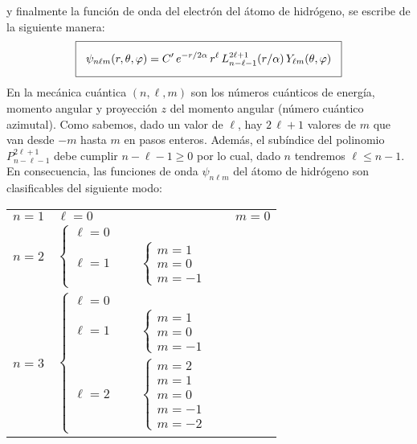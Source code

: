 y finalmente la función de onda del electrón del átomo de hidrógeno, se escribe de la siguiente manera:
\[ \setlength{\fboxsep}{3\fboxsep}\boxed{\psi_{n \ell m} (r, \theta, \varphi) = C^{\prime} \, e^{-r/2 \alpha} \, r^{\ell} \, L_{n -\ell-1}^{2 \ell+1} (r / \alpha) \, Y_{\ell m} (\theta, \varphi)} \]
En la mecánica cuántica $(n, \ell, m)$ son los números cuánticos de energía, momento angular y proyección $z$ del momento angular (número cuántico azimutal). Como sabemos, dado un valor de $\ell$, hay $2 \, \ell + 1$ valores de $m$ que van desde $-m$ hasta $m$ en pasos enteros. Además, el subíndice del polinomio $P_{n-\ell-1}^{2 \ell+1}$ debe cumplir $n - \ell - 1 \geq 0$ por lo cual, dado $n$ tendremos $\ell \leq n - 1$. En consecuencia, las funciones de onda $\psi_{n \ell m}$ del átomo de hidrógeno son clasificables del siguiente modo:
\begin{center}
\begin{tabular}{l l l}
$n=1$ & $\ell=0$ & \hspace{-3.5cm} $m=0$ \\
$n=2$ & $\begin{cases}
\ell = 0 \\
\ell =1 \hspace{1cm} \begin{cases}
    m = 1 \\
    m = 0 \\
    m = -1
    \end{cases}
\end{cases}$ &  \\
$n=3$ & $\begin{cases}
    \ell = 0 \\
    \ell = 1 \hspace{1cm} \begin{cases}
        m = 1 \\
        m = 0 \\
        m = -1
    \end{cases} & \\
\ell = 2 \hspace{1cm} \begin{cases}
    m = 2 \\
    m = 1 \\
    m = 0 \\
    m = -1 \\
    m = -2
\end{cases} 
\end{cases}$ & 
\end{tabular}
\end{center}
